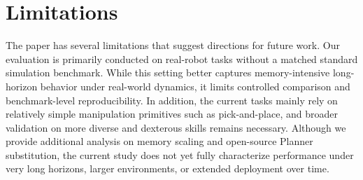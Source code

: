 \documentclass{article}
\theoremstyle{plain}
\theoremstyle{definition}
\theoremstyle{remark}
\begin{document}
\section*{Limitations}

The paper has several limitations that suggest directions for future work. Our evaluation is primarily conducted on real-robot tasks without a matched standard simulation benchmark. While this setting better captures memory-intensive long-horizon behavior under real-world dynamics, it limits controlled comparison and benchmark-level reproducibility. In addition, the current tasks mainly rely on relatively simple manipulation primitives such as pick-and-place, and broader validation on more diverse and dexterous skills remains necessary. Although we provide additional analysis on memory scaling and open-source Planner substitution, the current study does not yet fully characterize performance under very long horizons, larger environments, or extended deployment over time.
\nocite{langley00}




\newpage
\appendix
\onecolumn

\end{document}
